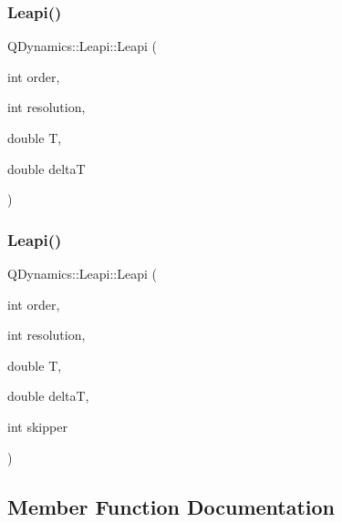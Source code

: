 \subsubsection{\texorpdfstring{Leapi()}{Leapi()}\hspace{0.1cm}{\footnotesize\ttfamily [1/2]}}
{\footnotesize\ttfamily Q\+Dynamics\+::\+Leapi\+::\+Leapi (\begin{DoxyParamCaption}\item[{int}]{order,  }\item[{int}]{resolution,  }\item[{double}]{T,  }\item[{double}]{deltaT }\end{DoxyParamCaption})\hspace{0.3cm}{\ttfamily [inline]}}

\mbox{\label{classQDynamics_1_1Leapi_a008a9a757055debd2e1da2b5ac64a746}} 
\subsubsection{\texorpdfstring{Leapi()}{Leapi()}\hspace{0.1cm}{\footnotesize\ttfamily [2/2]}}
{\footnotesize\ttfamily Q\+Dynamics\+::\+Leapi\+::\+Leapi (\begin{DoxyParamCaption}\item[{int}]{order,  }\item[{int}]{resolution,  }\item[{double}]{T,  }\item[{double}]{deltaT,  }\item[{int}]{skipper }\end{DoxyParamCaption})\hspace{0.3cm}{\ttfamily [inline]}}



\subsection{Member Function Documentation}
\mbox{\label{classQDynamics_1_1Leapi_ada2b4935513fa7e0cb4f78ade9f2fd0e}} 
